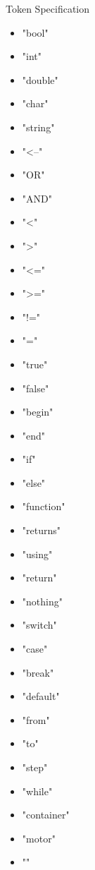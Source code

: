 
Token Specification 

\begin{itemize}

\item "bool"
\item "int"
\item "double"
\item "char"
\item "string"
\item "<--"
\item "OR"
\item "AND"
\item "<"
\item ">"
\item "<="
\item ">="
\item "!="
\item "="
\item "true"
\item "false"
\item "begin"
\item "end"
\item "if"
\item "else"
\item "function"
\item "returns"
\item "using"
\item "return"
\item "nothing"
\item "switch"
\item "case"
\item "break"
\item "default"
\item "from"
\item "to"
\item "step"
\item "while"



\item "container"
\item "motor"

\item ""
\end{itemize}
